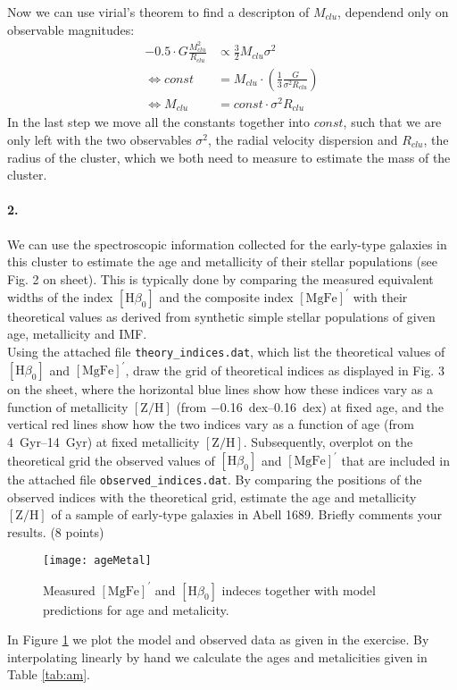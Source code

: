 \documentclass[11pt,a4paper,twoside]{article}
\newcommand{\MgFe}{\ensuremath{[\text{MgFe}]^\prime} }
\newcommand{\ZH}{\ensuremath{[\text{Z}/\text{H}]} }
\newcommand{\Hbo}{\ensuremath{[\text{H}\beta_0]} }
\begin{document}
Now we can use virial's theorem to find a descripton of $M_{clu}$, dependend
only on observable magnitudes:
\begin{align}
    -0.5\cdot G \frac{M_{clu}^2}{R_{clu}} &\propto \frac{3}{2} M_{clu} \sigma^2\\
    \Leftrightarrow const &= M_{clu} \cdot\left( \frac{1}{3}\frac{G}{\sigma^2 R_{clu}}\right) \\
    \Leftrightarrow M_{clu} &= const \cdot \sigma^2 R_{clu}
\end{align}
In the last step we move all the constants together into $const$, such that we
are only left with the two observables $\sigma^2$, the radial velocity dispersion
and $R_{clu}$, the radius of the cluster, which we both need
to measure to estimate the mass of the cluster.

\paragraph{2.} We can use the spectroscopic information collected for the 
early-type galaxies in this cluster to estimate the age and metallicity of 
their stellar populations (see Fig. 2 on sheet). This is typically done by comparing 
the measured equivalent widths of the index $\Hbo$ and the composite index 
$\MgFe$ with their theoretical values as derived from synthetic simple
stellar populations of given age, metallicity and IMF.\\

Using the attached file \verb+theory_indices.dat+, which list the theoretical 
values of $\Hbo$ and $\MgFe$, draw the grid of theoretical indices as 
displayed in Fig. 3 on the sheet, where the horizontal blue lines show how 
these indices vary as a function of metallicity $\ZH$ (from 
\SIrange{-0.16}{0.16}{dex}) at fixed age, and the vertical red lines show how 
the two indices vary as a function of age (from \SIrange{4}{14}{Gyr}) 
at fixed metallicity $\ZH$. Subsequently, overplot on the theoretical grid 
the observed values of $\Hbo$ and $\MgFe$ that are included in the attached 
file \verb+observed_indices.dat+. By comparing the positions of the observed 
indices with the theoretical grid, estimate the age and metallicity $\ZH$ of 
a sample of early-type galaxies in Abell 1689. Briefly comments your results. 
(8 points) \\

\begin{figure}[h!]
\centering
\texttt{[image: ageMetal]}
\caption{Measured \MgFe and \Hbo indeces together with model predictions
for age and metalicity.}
\label{fig:am}
\end{figure}
In Figure \ref{fig:am} we plot the model and observed data as given in the 
exercise. By interpolating linearly by hand we calculate the ages and
metalicities given in Table \ref{tab:am}.
\end{document}
